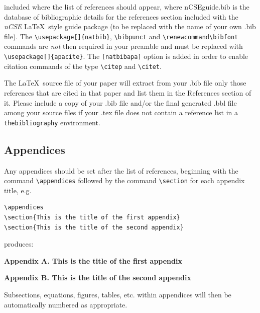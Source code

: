 \documentclass{nCSE2e}
\renewcommand\bibfont{\fontsize{10}{12}\selectfont}%
\begin{document}
\noindent included where the list of references should appear, where nCSEguide.bib is the database of bibliographic details for the references section included with the {\itshape nCSE} \LaTeX\ style guide package (to be replaced with the name of your own .bib file). The \verb"\usepackage[]{natbib}", \verb"\bibpunct" and \verb"\renewcommand\bibfont" commands are \emph{not} then required in your preamble and must be replaced with \verb"\usepackage[]{apacite}". The \verb"[natbibapa]" option is added in order to enable citation commands of the type \verb"\citep" and \verb"\citet".

The \LaTeX\ source file of your paper will extract from your .bib file only those references that are cited in that paper and list them in the References section of it. Please include a copy of your .bib file and/or the final generated .bbl file among your source files if your .tex file does not contain a reference list in a \texttt{thebibliography} environment.


\subsection{Appendices}\label{appendices}

Any appendices should be set after the list of references, beginning with the
command \verb"\appendices" followed by the command \verb"\section"
for each appendix title, e.g.
%
\begin{verbatim}
\appendices
\section{This is the title of the first appendix}
\section{This is the title of the second appendix}
\end{verbatim}

\noindent produces:\medskip

\noindent \textbf{Appendix A. This is the title of the first appendix}\vspace{10pt}

\noindent \textbf{Appendix B. This is the title of the second appendix}

\medskip
Subsections, equations, figures, tables, etc. within
appendices will then be automatically numbered as appropriate.
\end{document}
